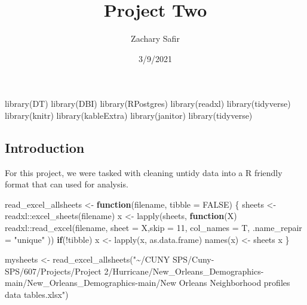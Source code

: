 \documentclass[
]{article}
\title{Project Two}
\author{Zachary Safir}
\date{3/9/2021}
\newenvironment{Shaded}{\begin{snugshade}}{\end{snugshade}}
\newcommand{\AttributeTok}[1]{\textcolor[rgb]{0.77,0.63,0.00}{#1}}
\newcommand{\ConstantTok}[1]{\textcolor[rgb]{0.00,0.00,0.00}{#1}}
\newcommand{\ControlFlowTok}[1]{\textcolor[rgb]{0.13,0.29,0.53}{\textbf{#1}}}
\newcommand{\DecValTok}[1]{\textcolor[rgb]{0.00,0.00,0.81}{#1}}
\newcommand{\FunctionTok}[1]{\textcolor[rgb]{0.00,0.00,0.00}{#1}}
\newcommand{\NormalTok}[1]{#1}
\newcommand{\OtherTok}[1]{\textcolor[rgb]{0.56,0.35,0.01}{#1}}
\newcommand{\SpecialCharTok}[1]{\textcolor[rgb]{0.00,0.00,0.00}{#1}}
\newcommand{\StringTok}[1]{\textcolor[rgb]{0.31,0.60,0.02}{#1}}
\begin{document}
\maketitle

\begin{Shaded}
\begin{Highlighting}[]
\FunctionTok{library}\NormalTok{(DT)}
\FunctionTok{library}\NormalTok{(DBI)}
\FunctionTok{library}\NormalTok{(RPostgres)}
\FunctionTok{library}\NormalTok{(readxl)}
\FunctionTok{library}\NormalTok{(tidyverse)}
\FunctionTok{library}\NormalTok{(knitr)}
\FunctionTok{library}\NormalTok{(kableExtra)}
\FunctionTok{library}\NormalTok{(janitor)}
\FunctionTok{library}\NormalTok{(tidyverse)}
\end{Highlighting}
\end{Shaded}

\hypertarget{introduction}{%
\subsection{Introduction}\label{introduction}}

For this project, we were tasked with cleaning untidy data into a R
friendly format that can used for analysis.

\begin{Shaded}
\begin{Highlighting}[]
\NormalTok{read\_excel\_allsheets }\OtherTok{\textless{}{-}} \ControlFlowTok{function}\NormalTok{(filename, }\AttributeTok{tibble =} \ConstantTok{FALSE}\NormalTok{) \{}
\NormalTok{    sheets }\OtherTok{\textless{}{-}}\NormalTok{ readxl}\SpecialCharTok{::}\FunctionTok{excel\_sheets}\NormalTok{(filename)}
\NormalTok{    x }\OtherTok{\textless{}{-}} \FunctionTok{lapply}\NormalTok{(sheets, }\ControlFlowTok{function}\NormalTok{(X) readxl}\SpecialCharTok{::}\FunctionTok{read\_excel}\NormalTok{(filename, }\AttributeTok{sheet =}\NormalTok{ X,}\AttributeTok{skip =} \DecValTok{11}\NormalTok{, }\AttributeTok{col\_names =}\NormalTok{ T, }\AttributeTok{.name\_repair =} \StringTok{"unique"}\NormalTok{ ))}
    \ControlFlowTok{if}\NormalTok{(}\SpecialCharTok{!}\NormalTok{tibble) x }\OtherTok{\textless{}{-}} \FunctionTok{lapply}\NormalTok{(x, as.data.frame)}
    \FunctionTok{names}\NormalTok{(x) }\OtherTok{\textless{}{-}}\NormalTok{ sheets}
\NormalTok{    x}
\NormalTok{\}}
\end{Highlighting}
\end{Shaded}

\begin{Shaded}
\begin{Highlighting}[]
\NormalTok{mysheets }\OtherTok{\textless{}{-}} \FunctionTok{read\_excel\_allsheets}\NormalTok{(}\StringTok{"\textasciitilde{}/CUNY SPS/Cuny{-}SPS/607/Projects/Project 2/Hurricane/New\_Orleans\_Demographics{-}main/New\_Orleans\_Demographics{-}main/New Orleans Neighborhood profiles data tables.xlsx"}\NormalTok{)}
\end{Highlighting}
\end{Shaded}
\end{document}
